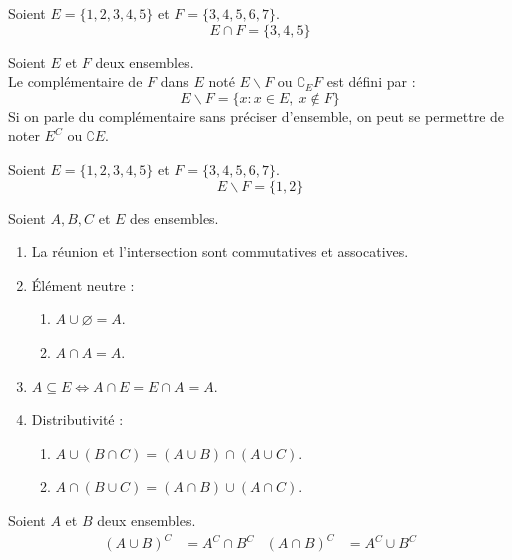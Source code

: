 \begin{example}
	Soient $E = \{ 1, 2, 3, 4, 5 \}$ et $F = \{ 3, 4, 5, 6, 7 \}$.
	\[ E \cap F = \{ 3, 4, 5 \} \]
\end{example}

\begin{definition}
  Soient $E$ et $F$ deux ensembles. 
  \\
  Le complémentaire de $F$ dans $E$ noté $E \backslash F$ ou $\complement_E F$ est défini par :
  \[ E \backslash F = \{ x : x \in E,\ x \notin F \} \]
  Si on parle du complémentaire sans préciser d'ensemble, on peut se permettre de noter $E^C$ ou $\complement E$.
\end{definition}

\begin{example}
	Soient $E = \{ 1, 2, 3, 4, 5 \}$ et $F = \{ 3, 4, 5, 6, 7 \}$.
	\[ E \backslash F = \{ 1, 2 \} \]
\end{example}

\begin{proposition}
	Soient $A, B, C$ et $E$ des ensembles.
	\begin{enumerate}
		\item La réunion et l'intersection sont commutatives et assocatives.
		\item \'Elément neutre :
		\begin{enumerate}
			\item $A \cup \varnothing = A$.
			\item $A \cap A = A$.
		\end{enumerate}
		\item $A \subseteq E \iff A \cap E = E \cap A = A$.
		\item Distributivité :
		\begin{enumerate}
			\item $A \cup (B \cap C) = (A \cup B) \cap (A \cup C)$.
			\item $A \cap (B \cup C) = (A \cap B) \cup (A \cap C)$.
		\end{enumerate}
	\end{enumerate}
\end{proposition}

\begin{proposition}
  Soient $A$ et $B$ deux ensembles.
  \begin{align*}
    (A \cup B)^{C} &= A^{C} \cap B^{C} & (A \cap B)^{C} &= A^{C} \cup B^{C}
  \end{align*}
\end{proposition}

